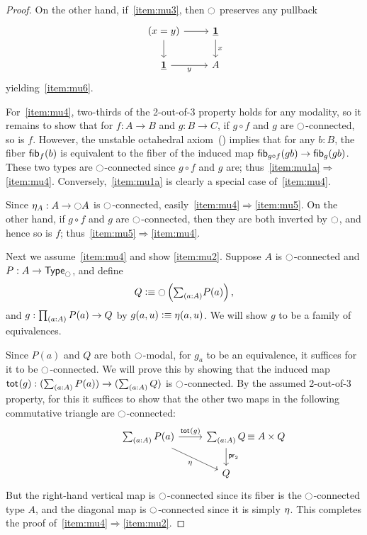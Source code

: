 \begin{proof}
  On the other hand, if~\ref{item:mu3}, then $\modal$ preserves any pullback
  \begin{equation}
  \begin{tikzcd}
  (x=y) \arrow[r] \arrow[d] 
    & \unit \arrow[d,"x"] \\
  \unit \arrow[r,"y"'] 
    & A
  \end{tikzcd}
  \end{equation}
  yielding~\ref{item:mu6}.

  For~\ref{item:mu4}, two-thirds of the 2-out-of-3 property holds for any modality, so it remains to show that for $f:A\to B$ and $g:B\to C$, if $g\circ f$ and $g$ are $\modal$-connected, so is $f$.
  However, the unstable octahedral axiom~(\cite[ex4.4]{hottbook}) implies that for any $b:B$, the fiber $\fib f b$ is equivalent to the fiber of the induced map $\fib{g\circ f}{gb} \to \fib{g}{gb}$.
  These two types are $\modal$-connected since $g\circ f$ and $g$ are; thus~\ref{item:mu1a}$\Rightarrow$\ref{item:mu4}.
  Conversely,~\ref{item:mu1a} is clearly a special case of~\ref{item:mu4}.

  Since $\modalunit[A] : A\to \modal A$ is $\modal$-connected, easily~\ref{item:mu4}$\Rightarrow$\ref{item:mu5}.
  On the other hand, if $g\circ f$ and $g$ are $\modal$-connected, then they are both inverted by $\modal$, and hence so is $f$; thus~\ref{item:mu5}$\Rightarrow$\ref{item:mu4}.

  Next we assume~\ref{item:mu4} and show \ref{item:mu2}.
  Suppose $A$ is $\modal$-connected and $P:A\to\modaltype$, and define
  \[ Q \defeq \modal\left(\sm{a:A} P(a)\right),\]
  and $g:\prd{a:A} P(a) \to Q$ by $g(a,u) \defeq \modalunit(a,u)$.
  We will show $g$ to be a family of equivalences.

  Since $P(a)$ and $Q$ are both $\modal$-modal, for $g_a$ to be an equivalence, it suffices for it to be $\modal$-connected.
  We will prove this by showing that the induced map $\total g:(\sm{a:A} P(a)) \to (\sm{a:A} Q)$ is $\modal$-connected.
  By the assumed 2-out-of-3 property, for this it suffices to show that the other two maps in the following commutative triangle are $\modal$-connected:
  \begin{equation}
  \begin{tikzcd}
  \sm{a:A} P(a) \arrow[r,"{\total g}"] \arrow[dr,swap,"{\modalunit}"]
    & \sm{a:A} Q \mathrlap{\,\jdeq A\times Q} \arrow[d,"\proj2"] \\
  & Q
  \end{tikzcd}
  \end{equation}
  But the right-hand vertical map is $\modal$-connected since its fiber is the $\modal$-connected type $A$,
  and the diagonal map is $\modal$-connected since it is simply $\modalunit$.
  This completes the proof of~\ref{item:mu4}$\Rightarrow$\ref{item:mu2}.


\end{proof}
